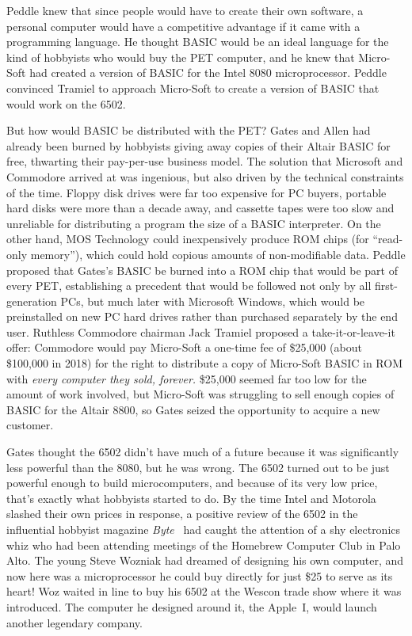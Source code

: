 Peddle knew that since people would have to create their own software,
a personal computer would have a competitive advantage if it came with
a programming language.
He thought BASIC would be an ideal language for the kind of hobbyists
who would buy the PET computer, and he knew that Micro-Soft had
created a version of BASIC for the Intel 8080 microprocessor.
Peddle convinced Tramiel to approach Micro-Soft to create a version of
BASIC that would work on the 6502.


But how would BASIC be distributed with the PET?
Gates and Allen had already been burned by hobbyists giving away
copies of their Altair BASIC for free, thwarting their pay-per-use
business model.
The solution that Microsoft and Commodore arrived at was ingenious,
but also driven by the technical constraints of the time.
Floppy disk drives were far too expensive for PC buyers, portable hard
disks were more than a decade away, and cassette tapes were too slow
and unreliable for distributing a program the size of a BASIC
interpreter.
On the other hand, MOS Technology could inexpensively produce ROM
chips (for ``read-only memory''), which could hold copious amounts of
non-modifiable data.
Peddle proposed that Gates's BASIC be burned into a ROM chip that
would be part of every PET, establishing a precedent that would be
followed not only by all first-generation PCs, but much later with
Microsoft Windows, which would be preinstalled on new PC hard drives
rather than purchased separately by the end user.
Ruthless Commodore chairman Jack Tramiel proposed a
take-it-or-leave-it offer: Commodore would pay Micro-Soft a one-time
fee of \$25,000 (about \$100,000 in 2018) for the right to distribute
a copy of Micro-Soft BASIC in ROM with \emph{every computer they sold, forever.}
\$25,000 seemed far too low for the amount of work involved, but
Micro-Soft was struggling to sell enough copies of BASIC for the
Altair 8800, so Gates seized the opportunity to acquire a new
customer.


Gates thought the 6502 didn't have much of a future because it was
significantly less powerful than the 8080, but he was wrong.
The 6502 turned out to be just powerful enough to build microcomputers, and
because of its very low price, that's exactly what hobbyists started
to do.
By the time Intel and Motorola 
slashed their own prices in response,
a positive review of the 6502 in the influential hobbyist magazine
\emph{Byte}~\cite{byte75:6502} had caught the attention of a shy
electronics whiz who had been attending meetings of the Homebrew
Computer Club in Palo Alto.
The young Steve Wozniak had dreamed of designing his own computer,
and now here was a microprocessor he could buy directly for just \$25
to serve as its heart!
Woz waited in line to buy his 6502 at the Wescon trade show where it was
introduced.  The computer he designed around it, the Apple~I,
would launch another legendary company.

